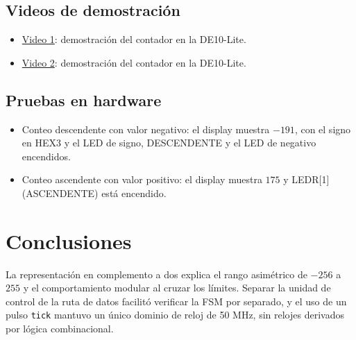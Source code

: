 \documentclass[11pt,a4paper]{article}
\begin{document}
\subsection{Videos de demostraci\'on}
\begin{itemize}
  \item \href{https://github.com/AdamPark7014/UNIVERSIDAD-app/blob/main/practica3/videos/video_1.mov}{Video 1}: demostraci\'on del contador en la DE10-Lite.
  \item \href{https://github.com/AdamPark7014/UNIVERSIDAD-app/blob/main/practica3/videos/video_2.mov}{Video 2}: demostraci\'on del contador en la DE10-Lite.
\end{itemize}

\subsection{Pruebas en hardware}
\begin{itemize}
  \item Conteo descendente con valor negativo: el display muestra $-191$, con el signo en HEX3 y el LED de signo, DESCENDENTE y el LED de negativo encendidos.
  \item Conteo ascendente con valor positivo: el display muestra $175$ y LEDR[1] (ASCENDENTE) est\'a encendido.
\end{itemize}

\section{Conclusiones}
La representaci\'on en complemento a dos explica el rango asim\'etrico de $-256$ a $255$ y el comportamiento modular al cruzar los l\'imites. Separar la unidad de control de la ruta de datos facilit\'o verificar la FSM por separado, y el uso de un pulso \texttt{tick} mantuvo un \'unico dominio de reloj de 50 MHz, sin relojes derivados por l\'ogica combinacional.

\end{document}
